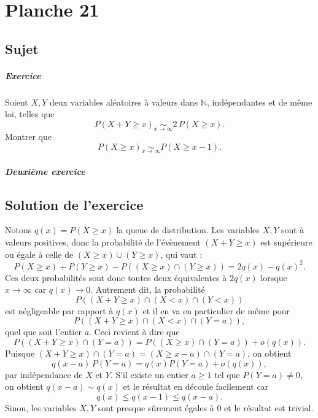 \chapter{Planche 21}

\section{Sujet}

\paragraph{Exercice}

Soient $X,Y$ deux variables aléatoires à valeurs dans $\mathbb N$, indépendantes et de même loi, telles que
$$
P(X+Y \geqslant x) \underset{x\to\infty}\sim 2\,P(X \geqslant x).
$$
Montrer que
$$
P(X \geqslant x) \underset{x\to\infty}\sim P(X \geqslant x-1).
$$

\paragraph{Deuxième exercice}

\section{Solution de l'exercice}

Notons $q(x) = P(X \geqslant x)$ la queue de distribution. Les variables $X,Y$ sont à valeurs positives, donc la probabilité de l'évènement $(X + Y \geqslant x)$ est supérieure ou égale à celle de $(X\geqslant x) \cup (Y \geqslant x)$, qui vaut :
\[
P(X\geqslant x) + P(Y \geqslant x) - P((X\geqslant x) \cap (Y \geqslant x)) = 2q(x) - q(x)^2.
\]
Ces deux probabilités sont donc toutes deux équivalentes à $2q(x)$ lorsque $x \to \infty$ car $q(x) \to 0$. Autrement dit, la probabilité
\[
P((X + Y \geqslant x) \cap (X < x) \cap (Y < x)) 
\]
est négligeable par rapport à $q(x)$ et il en va en particulier de même pour
\[
P((X + Y \geqslant x) \cap (X < x) \cap (Y = a)),
\]
quel que soit l'entier $a$. Ceci revient à dire que
\[
P((X+Y \geqslant x) \cap (Y = a)) = P((X \geqslant x) \cap (Y = a)) + o(q(x)).
\]
Puisque $(X+Y \geqslant x) \cap (Y=a) = (X \geqslant x - a) \cap (Y=a)$, on obtient
\[
q(x-a)\,P(Y = a) = q(x) P(Y = a) + o(q(x)),
\]
par indépendance de $X$ et $Y$. S'il existe un entier $a \geqslant 1$ tel que $P(Y = a) \neq 0$, on obtient $q(x - a) \sim q(x)$ et le résultat en découle facilement car
\[
q(x) \leqslant q(x-1) \leqslant q(x-a).
\]
Sinon, les variables $X,Y$ sont presque sûrement égales à $0$ et le résultat est trivial.